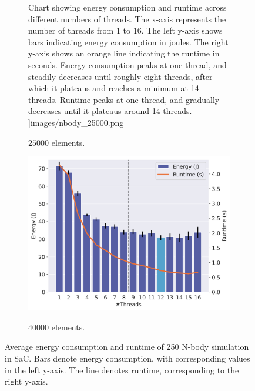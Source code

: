 \begin{figure}[!ht]
\begin{subfigure}{0.33\linewidth}
{            Chart showing energy consumption and runtime across different numbers of threads. The
            x-axis represents the number of threads from 1 to 16. The left y-axis shows bars
            indicating energy consumption in joules. The right y-axis shows an orange line
            indicating the runtime in seconds. Energy consumption peaks at one thread, and steadily
            decreases until roughly eight threads, after which it plateaus and reaches a minimum at
            14 threads. Runtime peaks at one thread, and gradually decreases until it plateaus
            around 14 threads.
        }]{images/nbody_25000.png}
        \caption{$25000$ elements.}
        \label{fig:nbody2}
    \end{subfigure}%
    \begin{subfigure}{0.33\linewidth}
        \includegraphics[width=\linewidth,alt={
            Chart showing energy consumption and runtime across different numbers of threads. The
            x-axis represents the number of threads from 1 to 16. The left y-axis shows bars
            indicating energy consumption in joules. The right y-axis shows an orange line
            indicating the runtime in seconds. Energy consumption peaks at one thread, and steadily
            decreases until roughly eight threads, after which it plateaus and reaches a minimum at
            12 threads. Runtime peaks at one thread, and gradually decreases until it plateaus
            around 12 threads.
        }]{images/nbody_40000.png}
        \caption{$40000$ elements.}
        \label{fig:nbody3}
    \end{subfigure}%
    \caption{Average energy consumption and runtime of 250 N-body simulation in SaC.
    Bars denote energy consumption, with corresponding values in the left y-axis.
    The line denotes runtime, corresponding to the right y-axis.}
    \label{fig:nbody}
\end{figure}

